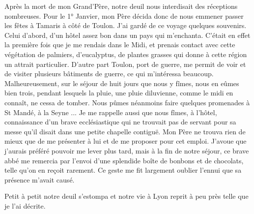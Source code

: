\documentclass[11pt,a4paper]{report}
\begin{document}
Après la mort de mon Grand'Père, notre deuil nous interdisait des réceptions nombreuses. Pour le 1° Janvier, mon Père décida donc de nous emmener passer les fêtes à Tamaris à côté de Toulon. J'ai gardé de ce voyage quelques souvenirs. Celui d'abord, d'un hôtel assez bon dans un pays qui m'enchanta. C'était en effet la première fois que je me rendais dans le Midi, et prenais contact avec cette végétation de palmiers, d'eucalyptus, de plantes grasses qui donne à cette région un attrait particulier. D'autre part Toulon, port de guerre, me permit de voir et de visiter plusieurs bâtiments de guerre, ce qui m'intéressa beaucoup. Malheureusement, sur le séjour de huit jours que nous y fîmes, nous en eûmes bien trois, pendant lesquels la pluie, une pluie diluvienne, comme le midi en connaît, ne cessa de tomber. Nous pûmes néanmoins faire quelques promenades à St Mandé, à la Seyne ... Je me rappelle aussi que nous fîmes, à l'hôtel, connaissance d'un brave ecclésiastique qui ne trouvait pas de servant pour sa messe qu'il disait dans une petite chapelle contiguë. Mon Père ne trouva rien de mieux que de me présenter à lui et de me proposer pour cet emploi. J'avoue que j'aurais préféré pouvoir me lever plus tard, mais à la fin de notre séjour, ce brave abbé me remercia par l'envoi d'une splendide boîte de bonbons et de chocolats, telle qu'on en reçoit rarement. Ce geste me fit largement oublier l'ennui que sa présence m'avait causé.

Petit à petit notre deuil s'estompa et notre vie à Lyon reprit à peu près telle que je l'ai décrite.
\end{document}
